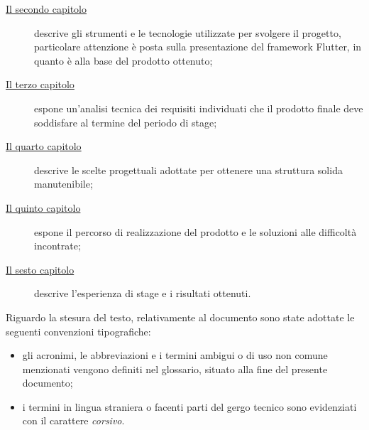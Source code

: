 \begin{description}
    \item[{\hyperref[cap:strumenti-utilizzati]{Il secondo capitolo}}] descrive gli strumenti e le tecnologie utilizzate per svolgere il progetto, particolare attenzione è posta sulla presentazione del framework Flutter, in quanto è alla base del prodotto ottenuto;
    
    \item[{\hyperref[cap:analisi-requisiti]{Il terzo capitolo}}] espone un'analisi tecnica dei requisiti individuati che il prodotto finale deve soddisfare al termine del periodo di stage;
    
    \item[{\hyperref[cap:progettazione]{Il quarto capitolo}}] descrive le scelte progettuali adottate per ottenere una struttura solida manutenibile;
    
    \item[{\hyperref[cap:sviluppo]{Il quinto capitolo}}] espone il percorso di realizzazione del prodotto e le soluzioni alle difficoltà incontrate;
    
    \item[{\hyperref[cap:conclusioni]{Il sesto capitolo}}] descrive l'esperienza di stage e i risultati ottenuti.
\end{description}

Riguardo la stesura del testo, relativamente al documento sono state adottate le seguenti convenzioni tipografiche:
\begin{itemize}
	\item gli acronimi, le abbreviazioni e i termini ambigui o di uso non comune menzionati vengono definiti nel glossario, situato alla fine del presente documento;
	\item i termini in lingua straniera o facenti parti del gergo tecnico sono evidenziati con il carattere \emph{corsivo}.
\end{itemize}